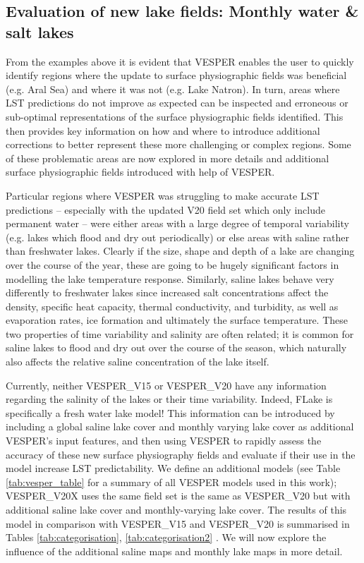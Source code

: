 \documentclass[hess, twostagejnl]{copernicus}
\begin{document}
\subsection{Evaluation of new lake fields: Monthly water \& salt lakes}
From  the examples  above  it  is  evident  that  VESPER  enables  the  user  to  quickly  identify  regions  where  the  update  to  surface physiographic fields was beneficial (e.g. Aral Sea) and where it was not (e.g. Lake Natron). In turn, areas where LST predictions do not improve as expected can be inspected and erroneous or sub-optimal representations of the surface  physiographic  fields  identified.  This  then  provides  key  information  on  how  and  where  to  introduce  additional corrections to better represent these more challenging or complex regions. Some of these problematic areas are now explored in more details and additional surface physiographic fields introduced with help of VESPER. \newline 

Particular regions where VESPER was struggling to make accurate LST predictions – especially with the updated V20 field set which only include permanent water – were either areas with a large degree of temporal variability (e.g. lakes which flood and dry out periodically) or else areas with saline rather than freshwater lakes. Clearly if the size, shape and depth of a lake are changing over the course of the year, these are going to be hugely significant factors in modelling the lake temperature response. Similarly, saline lakes behave very differently to freshwater lakes since increased salt concentrations affect the density, specific heat capacity, thermal conductivity, and turbidity, as well as evaporation rates, ice formation and ultimately the surface temperature. These two properties of time variability and salinity are often related; it is common for saline lakes to flood and dry out over the course of the season, which naturally also affects the relative saline concentration of the lake itself. \newline 


Currently, neither VESPER\_V15 or VESPER\_V20 have any information regarding the salinity of the lakes or their time variability. Indeed, FLake is specifically a fresh water lake model! This information can be introduced by including a global saline lake cover and monthly varying lake cover as additional VESPER’s input features, and then using VESPER to rapidly assess the accuracy of these new surface physiography fields and evaluate if their use in the model increase LST predictability. We define an additional models (see Table \ref{tab:vesper_table} for a summary of all VESPER models used in this work); VESPER\_V20X uses the same field set is the same as VESPER\_V20 but with additional saline lake cover and monthly-varying lake cover. The results of this model in comparison with VESPER\_V15 and VESPER\_V20 is summarised in Tables \ref{tab:categorisation}, \ref{tab:categorisation2} . We will now explore the influence of the additional saline maps and monthly lake maps in more detail.
\end{document}
